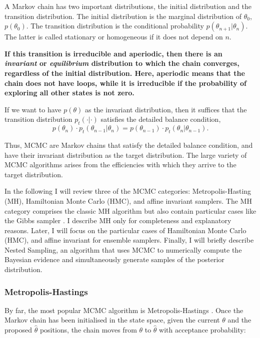 A Markov chain has two important distributions, the initial distribution and the transition distribution. The initial distribution is the marginal distribution of $\theta_0$, $p(\theta_0)$. The transition distribution is the conditional probability $p(\theta_{n+1} |\theta_n)$. The latter is called stationary or homogeneous if it does not depend on $n$.

\textbf{If this transition is irreducible and aperiodic, then there is an \emph{invariant} or \emph{equilibrium} distribution to which the chain converges, regardless of the initial distribution. Here, aperiodic means that the chain does not have loops, while it is irreducible if the probability of exploring all other states is not zero.}

If we want to have $p(\theta)$ as the invariant distribution, then it suffices that the transition distribution $p_t(\cdot | \cdot)$ satisfies the detailed balance condition,
\begin{equation}
\label{eq:detailedbalance}
p(\theta_{n})\cdot p_t(\theta_{n-1}|\theta_n)=p(\theta_{n-1})\cdot p_t(\theta_n | \theta_{n-1}).
\end{equation}

Thus, MCMC are Markov chains that satisfy the detailed balance condition, and have their invariant distribution as the target distribution. 
The large variety of MCMC algorithms arises from the efficiencies with which they arrive to the target distribution.

In the following I will review three of the MCMC categories: Metropolis-Hasting (MH), Hamiltonian Monte Carlo (HMC), and affine invariant samplers. The MH category comprises the classic MH algorithm but also contain particular cases like the Gibbs sampler \citep{Geman1984}. I describe MH only for completeness and explanatory reasons. Later, I will focus on the particular cases of Hamiltonian Monte Carlo (HMC), and affine invariant for ensemble samplers. Finally, I will briefly describe Nested Sampling, an algorithm that uses MCMC to numerically compute the Bayesian evidence and simultaneously generate samples of the posterior distribution. 
\subsubsection{Metropolis-Hastings}
By far, the most popular MCMC algorithm is Metropolis-Hastings \citep{Metropolis1953,Hastings1970}. Once the Markov chain has been initialised in the state space, given the current $\theta$ and the proposed $\hat{\theta}$ positions, the chain moves from $\theta$ to $\hat{\theta}$ with acceptance probability:

